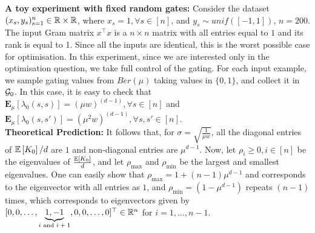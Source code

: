 \textbf{A toy experiment with fixed random gates:} Consider the dataset $(x_s,y_s)_{s=1}^n\in \mathbb{R}\times \mathbb{R}$, where $x_s=1,\forall s\in [n]$, and $y_s\sim unif([-1,1])$, $n=200$. The input Gram matrix $x^\top x$ is a $n\times n$ matrix with all entries equal to $1$ and its rank is equal to 1. Since all the inputs are identical, this is the worst possible case for optimisation. In this experiment, since we are interested only in the optimisation question, we take full control of the gating. For each input example, we sample gating values from $Ber(\mu)$ taking values in $\{0,1\}$, and collect it in $\mathcal{G}_0$. In this case, it is easy to check that $\mathbf{E}_{\mu}\left[\lambda_0(s,s)\right]=(\mu w)^{(d-1)},\forall s\in[n]$ and $\mathbf{E}_{\mu}\left[\lambda_0(s,s')\right]=(\mu^2 w)^{(d-1)},\forall s,s'\in[n]$.\hfill\\
\textbf{Theoretical Prediction:} It follows that,  for $\sigma=\sqrt{\frac{1}{\mu w}}$, all the diagonal entries of $\mathbb{E}\left[K_0\right]/d$ are $1$ and non-diagonal entries are $\mu^{d-1}$. Now, let $\rho_i\geq 0,i \in [n]$ be the eigenvalues of $\frac{\mathbb{E}\left[K_0\right]}{d}$, and let $\rho_{\max}$ and $\rho_{\min}$ be the largest and smallest eigenvalues.  One can easily show that $\rho_{\max}=1+(n-1)\mu^{d-1}$ and corresponds to the eigenvector with all entries as $1$, and $\rho_{\min}=(1-\mu^{d-1})$ repeats $(n-1)$ times, which corresponds to eigenvectors given by $[0, 0, \ldots, \underbrace{1, -1}_{\text{$i$ and $i+1$}}, 0,0,\ldots, 0]^\top \in \mathbb{R}^n$ for $i=1,\ldots,n-1$.\hfill\\
